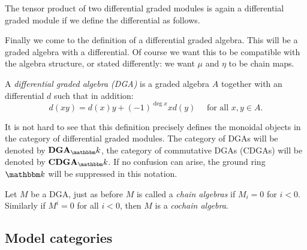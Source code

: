 The tensor product of two differential graded modules is again a differential graded module if we define the differential as follows. 

Finally we come to the definition of a differential graded algebra. This will be a graded algebra with a differential. Of course we want this to be compatible with the algebra structure, or stated differently: we want $\mu$ and $\eta$ to be chain maps.

\begin{definition}
	A \emph{differential graded algebra (DGA)} is a graded algebra $A$ together with an differential $d$ such that in addition:
	$$ d(xy) = d(x) y + (-1)^{\deg{x}} x d(y) \quad\text{ for all } x, y \in A. $$
\end{definition}

It is not hard to see that this definition precisely defines the monoidal objects in the category of differential graded modules. The category of DGAs will be denoted by $\DGA_\k$, the category of commutative DGAs (CDGAs) will be denoted by $\CDGA_\k$. If no confusion can arise, the ground ring $\k$ will be suppressed in this notation.

Let $M$ be a DGA, just as before $M$ is called a \emph{chain algebras} if $M_i = 0$ for $i < 0$. Similarly if $M^i = 0$ for all $i < 0$, then $M$ is a \emph{cochain algebra}.


\subsection{Model categories}

\newcommand{\W}{\mathfrak{W}}
\newcommand{\Fib}{\mathfrak{Fib}}
\newcommand{\Cof}{\mathfrak{Cof}}

